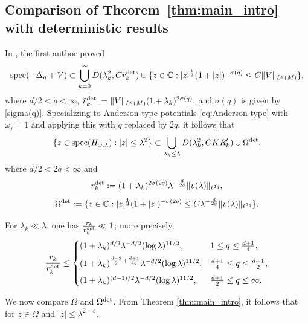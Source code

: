 \documentclass[12pt,reqno]{amsart}
\theoremstyle{definition}
\theoremstyle{remark}
\numberwithin{equation}{section}
\newcommand{\1}{\mathbbm{1}}
\newcommand{\C}{\mathbb{C}}
\renewcommand{\epsilon}{\varepsilon}
\DeclareMathOperator{\spec}{spec}
\begin{document}
\subsection{Comparison of Theorem~\ref{thm:main_intro} with deterministic results}\label{comparison between the random and deterministic results}

In \cite{Cuenin2026}, the first author proved 
\begin{align}\label{spectral inclusion}
  \spec(-\Delta_{g}+V)\subset \bigcup_{k=0}^{\infty}D(\lambda_k^2,C\tilde{r}_k^{\rm det})\cup \{z\in\C: |z|^{\frac{1}{2}}(1+|z|)^{-\sigma(q)}\leq C \|V\|_{L^q(M)}\},
\end{align}
where $d/2<q< \infty$,
\(
\tilde{r}_k^{\rm det}:=\|V\|_{L^q(M)}(1+\lambda_k)^{2\sigma(q)},
\)
and $\sigma(q)$ is given by \eqref{sigma(q)}. Specializing to Anderson-type potentials \eqref{eq:Anderson-type} with $\omega_j=1$ and applying this with $q$ replaced by $2q$, it follows that
\[
\{z\in\spec(H_{\omega,\lambda}) : |z|\leq \lambda^2\}
\subset
\bigcup_{\lambda_k\leq \lambda} D(\lambda_k^2,CKR_k')\cup \Omega^{\rm det},
\]
where $d/2<2q< \infty$ and
\[
r_k^{\rm det}:=(1+\lambda_k)^{2\sigma(2q)}\lambda^{-\frac{d}{2q}}\|v(\lambda)\|_{\ell^{2q}},
\]
%
\[
\Omega^{\rm det}:=\{z\in\C: |z|^{\frac{1}{2}}(1+|z|)^{-\sigma(2q)}\leq C\lambda^{-\frac{d}{2q}}\|v(\lambda)\|_{\ell^{2q}}\}.
\]

 For $\lambda_k\ll \lambda$, one has $\frac{r_k}{r_k^{\rm det}}\ll 1$; more precisely,
\begin{align}\label{eq: r_k/r_kdet}
\frac{r_k}{r_k^{\rm det}}
\leq 
\begin{cases}
(1+\lambda_k)^{d/2}\lambda^{-d/2}(\log\lambda)^{11/2},
& 1\le q\le \frac{d+1}{4},\\[2mm]
(1+\lambda_k)^{\frac{d-2}{2}+\frac{d+1}{4q}}
\lambda^{-d/2}(\log\lambda)^{11/2},
& \frac{d+1}{4}\le q\le \frac{d+1}{2},\\[2mm]
(1+\lambda_k)^{(d-1)/2}\lambda^{-d/2}(\log\lambda)^{11/2},
& \frac{d+1}{2}\le q\le \infty.
\end{cases}
\end{align}

We now compare $\Omega$ and $\Omega^{\rm det}$. From Theorem \ref{thm:main_intro}, it follows that for $z\in\Omega$ and $|z|\leq \lambda^{2-\epsilon}$.
\end{document}
